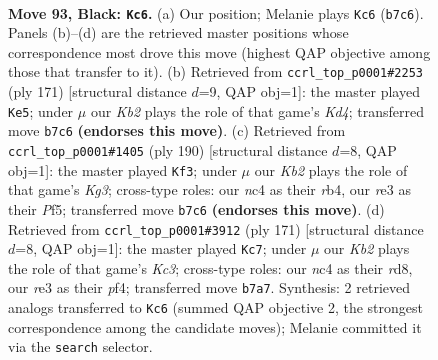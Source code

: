 \documentclass[11pt]{article}
\begin{document}
\clearpage

\begin{figure}[p]\centering
\begin{subfigure}{0.46\textwidth}\centering
\resizebox{\linewidth}{!}{%
\newchessgame
\chessboard[
  setfen={8/1k6/8/5K2/2N5/4R3/6P1/3r4 b - - 51 93},
  showmover=false,
  pgfstyle=straightmove, color=movearrow, markmove={b7-c6}
]}
\caption{}
\end{subfigure}\hfill
\begin{subfigure}{0.46\textwidth}\centering
\resizebox{\linewidth}{!}{%
\newchessgame
\chessboard[
  setfen={8/8/8/3k4/6p1/7r/1N1K4/2R5 b - - 18 86},
  showmover=false,
  pgfstyle=straightmove, color=movearrow, markmove={d5-e5}
]}
\caption{}
\end{subfigure}
\\[4pt]
\begin{subfigure}{0.46\textwidth}\centering
\resizebox{\linewidth}{!}{%
\newchessgame
\chessboard[
  setfen={8/R7/5p1k/5P2/1r6/6K1/8/8 w - - 4 96},
  showmover=false,
  pgfstyle=straightmove, color=movearrow, markmove={g3-f3}
]}
\caption{}
\end{subfigure}\hfill
\begin{subfigure}{0.46\textwidth}\centering
\resizebox{\linewidth}{!}{%
\newchessgame
\chessboard[
  setfen={3R4/6r1/2k1p3/8/5P2/8/2K5/8 b - - 0 86},
  showmover=false,
  pgfstyle=straightmove, color=movearrow, markmove={c6-c7}
]}
\caption{}
\end{subfigure}
\caption{\textbf{Move 93, Black: \texttt{Kc6}.} (a) Our position; Melanie plays \texttt{Kc6} (\texttt{b7c6}). Panels (b)--(d) are the retrieved master positions whose correspondence most drove this move (highest QAP objective among those that transfer to it). (b) Retrieved from \texttt{ccrl\_top\_p0001\#2253} (ply 171) [structural distance $d$=9, QAP obj=1]: the master played \texttt{Ke5}; under $\mu$ our \emph{Kb2} plays the role of that game's \emph{Kd4}; transferred move \texttt{b7c6} \textbf{(endorses this move)}. (c) Retrieved from \texttt{ccrl\_top\_p0001\#1405} (ply 190) [structural distance $d$=8, QAP obj=1]: the master played \texttt{Kf3}; under $\mu$ our \emph{Kb2} plays the role of that game's \emph{Kg3}; cross-type roles: our \emph{n}c4 as their \emph{r}b4, our \emph{r}e3 as their \emph{P}f5; transferred move \texttt{b7c6} \textbf{(endorses this move)}. (d) Retrieved from \texttt{ccrl\_top\_p0001\#3912} (ply 171) [structural distance $d$=8, QAP obj=1]: the master played \texttt{Kc7}; under $\mu$ our \emph{Kb2} plays the role of that game's \emph{Kc3}; cross-type roles: our \emph{n}c4 as their \emph{r}d8, our \emph{r}e3 as their \emph{p}f4; transferred move \texttt{b7a7}. Synthesis: 2 retrieved analogs transferred to \texttt{Kc6} (summed QAP objective 2, the strongest correspondence among the candidate moves); Melanie committed it via the \texttt{search} selector.}
\label{fig:thought-m185}
\end{figure}
\end{document}
